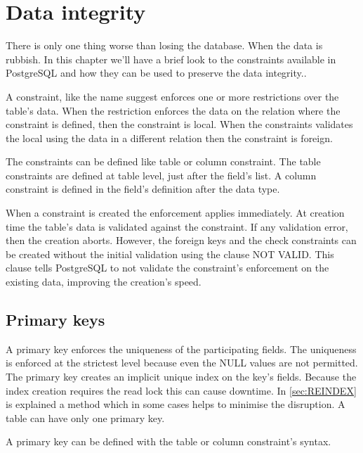 \chapter{Data integrity}
\label{cha:DATAINT}
There is only one thing worse than losing the database. When the data is rubbish. In this chapter we'll
have a brief look to the constraints available in PostgreSQL and how they can be used to preserve the
data integrity..\newline

A constraint, like the name suggest enforces one or more restrictions over the
table's data. When the restriction enforces the data on the relation where the constraint is defined,
then the constraint is local. When the constraints validates the local using the data in a different
relation then the constraint is foreign.\newline

The constraints can be defined like table or column constraint. The table constraints are defined at
table level, just after the field's list. A column constraint is defined in the field's definition after
the data type.\newline

When a constraint is created the enforcement applies immediately. At creation time the table's data is
validated against the constraint. If any validation error, then the creation aborts. However, the foreign
keys and the check constraints can be created without the initial validation using the clause NOT
VALID. This clause tells PostgreSQL to not validate the constraint's
enforcement on the existing data, improving the creation's speed.

\section{Primary keys}
A primary key enforces the uniqueness of the participating fields. The uniqueness is enforced at
the strictest level because even the NULL values are not permitted. The primary key creates an implicit
unique index on the key's fields. Because the index creation requires the read lock this can cause
downtime. In \ref{sec:REINDEX} is explained a method which in some cases helps to minimise the
disruption. A table can have only one primary key.\newline

A primary key can be defined with the table or column constraint's syntax.


